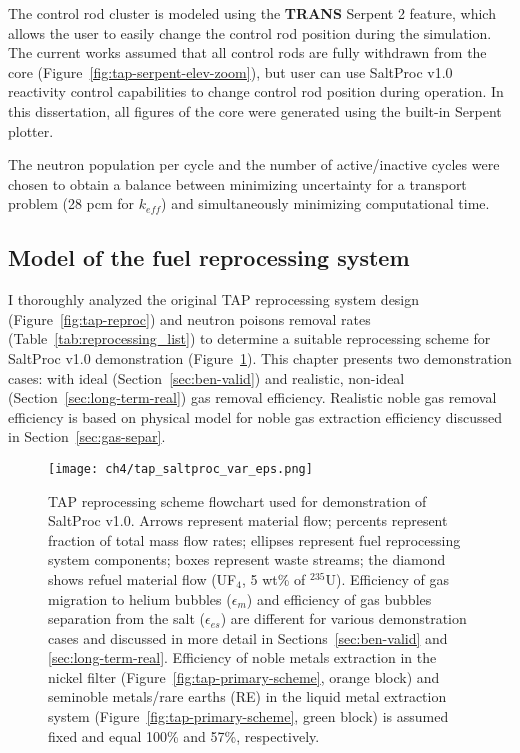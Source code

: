 The control rod cluster is modeled using the \textbf{TRANS} Serpent 2 feature, 
which allows the user to easily change the control rod position during the 
simulation. The current works assumed that all control rods are fully 
withdrawn from the core (Figure~\ref{fig:tap-serpent-elev-zoom}), but user can 
use SaltProc v1.0 reactivity control capabilities to change control 
rod position during operation. In this dissertation, all figures of the core 
were generated using the built-in Serpent plotter.

The neutron population per cycle and the number of active/inactive cycles were 
chosen to obtain a balance between minimizing uncertainty for a transport 
problem (28 pcm for $k_{eff}$) and simultaneously minimizing computational 
time.


\subsection{Model of the fuel reprocessing system}
I thoroughly analyzed the original \gls{TAP} reprocessing system design 
(Figure~\ref{fig:tap-reproc}) and neutron poisons removal rates  
(Table~\ref{tab:reprocessing_list}) to determine a suitable reprocessing 
scheme for SaltProc v1.0 demonstration (Figure~\ref{fig:demo-repro-scheme}). 
This chapter presents two demonstration cases: with ideal 
(Section~\ref{sec:ben-valid}) and realistic, non-ideal 
(Section~\ref{sec:long-term-real}) gas removal efficiency. Realistic noble gas 
removal efficiency is based on physical model for noble gas extraction 
efficiency discussed in Section~\ref{sec:gas-separ}. 
\begin{figure}[htp!] %
	\centering
	\texttt{[image: ch4/tap\_saltproc\_var\_eps.png]}
	\caption{\gls{TAP} reprocessing scheme flowchart used for demonstration of 
	SaltProc v1.0. Arrows represent material flow; percents represent fraction 
	of total mass flow rates; ellipses represent fuel reprocessing system 
	components; boxes represent waste streams; the diamond shows refuel 
	material flow (UF$_4$, 5 wt\% of $^{235}$U). Efficiency of gas migration 
	to 	helium bubbles 	($\epsilon_m$) and efficiency of gas bubbles 
	separation from the salt ($\epsilon_{es}$) are different for various 
	demonstration cases and discussed in more detail in 
	Sections~\ref{sec:ben-valid} and \ref{sec:long-term-real}. Efficiency of 
	noble metals extraction in the nickel filter 
	(Figure~\ref{fig:tap-primary-scheme}, orange block) and 	
	seminoble metals/rare earths (RE) in the liquid metal extraction system 
	(Figure~\ref{fig:tap-primary-scheme}, green block) is assumed fixed 	
	and equal 100\% and 57\%, respectively.}
	\label{fig:demo-repro-scheme}
\end{figure}

